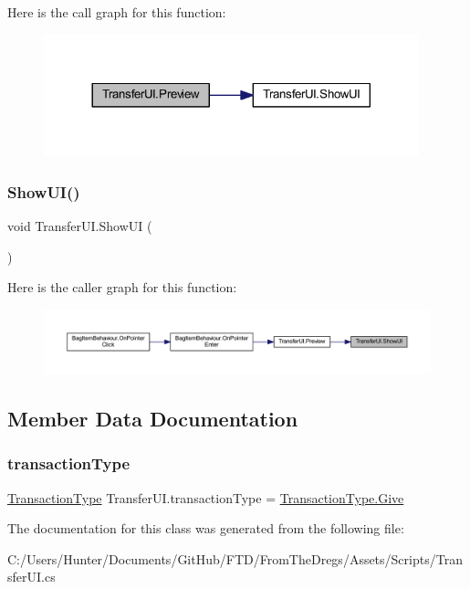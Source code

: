 Here is the call graph for this function\+:
\nopagebreak
\begin{figure}[H]
\begin{center}
\leavevmode
\includegraphics[width=308pt]{class_transfer_u_i_a52bd586cae27d6570e207d856457a116_cgraph}
\end{center}
\end{figure}
\mbox{\label{class_transfer_u_i_acb1dacb30d206743a569f8dc6bf9e5e4}} 
\subsubsection{\texorpdfstring{ShowUI()}{ShowUI()}}
{\footnotesize\ttfamily void Transfer\+U\+I.\+Show\+UI (\begin{DoxyParamCaption}{ }\end{DoxyParamCaption})}

Here is the caller graph for this function\+:
\nopagebreak
\begin{figure}[H]
\begin{center}
\leavevmode
\includegraphics[width=350pt]{class_transfer_u_i_acb1dacb30d206743a569f8dc6bf9e5e4_icgraph}
\end{center}
\end{figure}


\subsection{Member Data Documentation}
\mbox{\label{class_transfer_u_i_a7a235277eb0406680963562b2088d136}} 
\subsubsection{\texorpdfstring{transactionType}{transactionType}}
{\footnotesize\ttfamily \mbox{\hyperlink{class_transfer_u_i_acb894008318cb07b7144beb2d6d81606}{Transaction\+Type}} Transfer\+U\+I.\+transaction\+Type = \mbox{\hyperlink{class_transfer_u_i_acb894008318cb07b7144beb2d6d81606a2f355d9fa7accc561d3edc335de2fbcf}{Transaction\+Type.\+Give}}}



The documentation for this class was generated from the following file\+:\begin{DoxyCompactItemize}
\item 
C\+:/\+Users/\+Hunter/\+Documents/\+Git\+Hub/\+F\+T\+D/\+From\+The\+Dregs/\+Assets/\+Scripts/Transfer\+U\+I.\+cs\end{DoxyCompactItemize}
